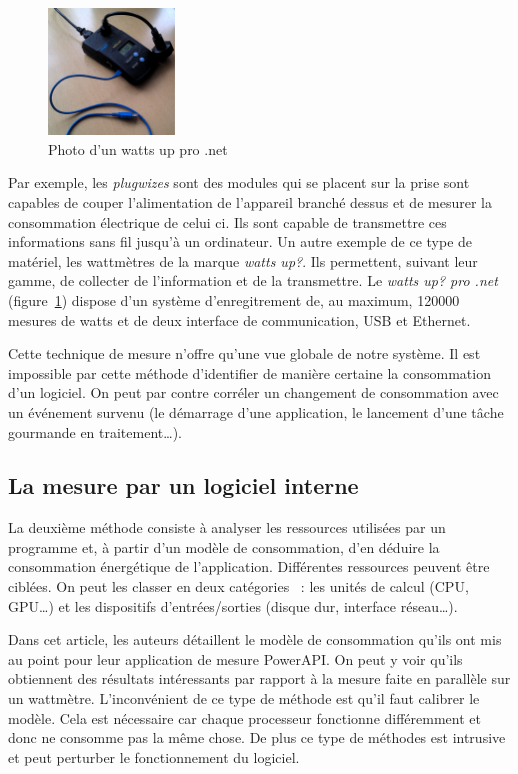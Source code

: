 \documentclass[a4paper, 11pt]{report}
\begin{document}
\begin{figure}
		\includegraphics[width=0.3\textwidth]{figures/wattsUp}
		\caption{Photo d'un watts up pro .net}
		\label{wattsUp}
\end{figure}

Par exemple, les \textit{plugwizes} sont des modules qui se placent sur la prise sont capables de couper l'alimentation de l'appareil branché dessus et de mesurer la consommation électrique de celui ci. Ils sont capable de transmettre ces informations sans fil jusqu'à un ordinateur. Un autre exemple de ce type de matériel, les wattmètres de la marque \textit{watts up\/?}. Ils permettent, suivant leur gamme, de collecter de l'information et de la transmettre. Le \textit{watts up\/? pro .net} (figure~\ref{wattsUp}) dispose d'un système d'enregitrement de, au maximum, 120000 mesures de watts et de deux interface de communication, USB et Ethernet.

Cette technique de mesure n'offre qu'une vue globale de notre système. Il est impossible par cette méthode d'identifier de manière certaine la consommation d'un logiciel. On peut par contre corréler un changement de consommation avec un événement survenu\cite{GreenMining} (le démarrage d'une application, le lancement d'une tâche gourmande en traitement\ldots). 

			\subsection{La mesure par un logiciel interne}
La deuxième méthode consiste à analyser les ressources utilisées par un programme et, à partir d'un modèle de consommation, d'en déduire la consommation énergétique de l'application. Différentes ressources peuvent être ciblées. On peut les classer en deux catégories ~: les unités de calcul (CPU, GPU\ldots) et les dispositifs d'entrées/sorties (disque dur, interface réseau\ldots).

Dans cet article\cite{noureddine:hal-00681560}, les auteurs détaillent le modèle de consommation qu'ils ont mis au point pour leur application de mesure PowerAPI. On peut y voir qu'ils obtiennent des résultats intéressants par rapport à la mesure faite en parallèle sur un wattmètre. L'inconvénient de ce type de méthode est qu'il faut calibrer le modèle. Cela est nécessaire car chaque processeur  fonctionne différemment et donc ne consomme pas la même chose. De plus ce type de méthodes est intrusive et peut perturber le fonctionnement du logiciel.
\end{document}
